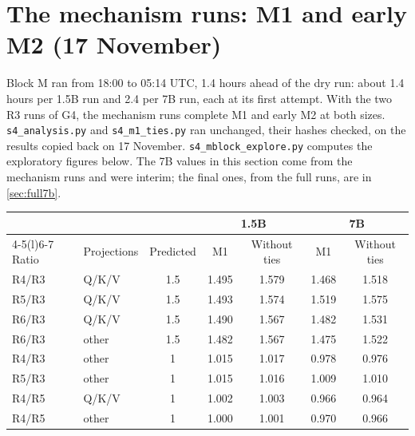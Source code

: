 \documentclass[11pt]{article}
\begin{document}
\section{The mechanism runs: M1 and early M2 (17 November)}\label{sec:mblock}
Block M ran from 18:00 to 05:14 UTC, 1.4 hours ahead of the dry run: about 1.4 hours per 1.5B run and 2.4 per 7B run, each at its first attempt. With the two R3 runs of G4, the mechanism runs complete M1 and early M2 at both sizes. \texttt{s4\_analysis.py} and \texttt{s4\_m1\_ties.py} ran unchanged, their hashes checked, on the results copied back on 17 November. \texttt{s4\_mblock\_explore.py} computes the exploratory figures below. The 7B values in this section come from the mechanism runs and were interim; the final ones, from the full runs, are in \cref{sec:full7b}.
\begin{center}\small
\begin{tabular}{@{}l l c c c c c@{}}
\toprule
& & & \multicolumn{2}{c}{1.5B} & \multicolumn{2}{c}{7B}\\
\cmidrule(lr){4-5}\cmidrule(l){6-7}
Ratio & Projections & Predicted & M1 & Without ties & M1 & Without ties\\
\midrule
R4/R3 & Q/K/V & 1.5 & 1.495 & 1.579 & 1.468 & 1.518\\
R5/R3 & Q/K/V & 1.5 & 1.493 & 1.574 & 1.519 & 1.575\\
R6/R3 & Q/K/V & 1.5 & 1.490 & 1.567 & 1.482 & 1.531\\
R6/R3 & other & 1.5 & 1.482 & 1.567 & 1.475 & 1.522\\
R4/R3 & other & 1 & 1.015 & 1.017 & 0.978 & 0.976\\
R5/R3 & other & 1 & 1.015 & 1.016 & 1.009 & 1.010\\
R4/R5 & Q/K/V & 1 & 1.002 & 1.003 & 0.966 & 0.964\\
R4/R5 & other & 1 & 1.000 & 1.001 & 0.970 & 0.966\\
\bottomrule
\end{tabular}
\end{center}
\end{document}
